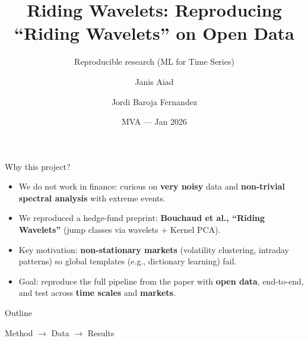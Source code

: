 \documentclass[10pt]{beamer}
\title{Riding Wavelets: Reproducing ``Riding Wavelets'' on Open Data}
\subtitle{Reproducible research (ML for Time Series)}
\author{Janis Aiad \and Jordi Baroja Fernandez}
\date{MVA --- Jan 2026}
\newenvironment{fboxenv}[1]{%
  \begin{beamerboxesrounded}[shadow=true,upper=fbox title,lower=fbox body]{#1}%
}{%
  \end{beamerboxesrounded}%
}
\begin{document}
\begin{frame}
  \titlepage
\end{frame}


\begin{frame}{Why this project?}
\begin{itemize}
  \item We do not work in finance: curious on \textbf{very noisy} data and \textbf{non-trivial spectral analysis} with extreme events.
  \item We reproduced a hedge-fund preprint: \textbf{Bouchaud et al., ``Riding Wavelets''} (jump classes via wavelets + Kernel PCA).
  \item Key motivation: \textbf{non-stationary markets} (volatility clustering, intraday patterns) so global templates (e.g., dictionary learning) fail.
  \item Goal: reproduce the full pipeline from the paper with \textbf{open data}, end-to-end, and test across \textbf{time scales} and \textbf{markets}.

\end{itemize}
\vspace{0.25em}
\begin{fboxenv}{Outline}
Method $\xrightarrow{}$ Data $\xrightarrow{}$ Results
\end{fboxenv}
\end{frame}
\end{document}
